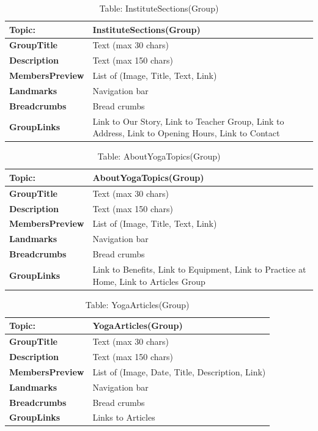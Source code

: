 \begin{table}[H]
\centering
\begin{tabularx}{\textwidth}{|>{\bfseries}l|X|}
\hline
Topic: & \textbf{InstituteSections(Group)} \\
\hline
GroupTitle & Text (max 30 chars) \\
\hline
Description & Text (max 150 chars) \\
\hline
MembersPreview & List of (Image, Title, Text, Link) \\
\hline
Landmarks & Navigation bar \\
\hline
Breadcrumbs & Bread crumbs \\
\hline
GroupLinks & Link to Our Story, Link to Teacher Group, Link to Address, Link to Opening Hours, Link to Contact \\
\hline
\end{tabularx}
\caption{Table: InstituteSections(Group)}
\end{table}

\begin{table}[H]
\centering
\begin{tabularx}{\textwidth}{|>{\bfseries}l|X|}
\hline
Topic: & \textbf{AboutYogaTopics(Group)} \\
\hline
GroupTitle & Text (max 30 chars) \\
\hline
Description & Text (max 150 chars) \\
\hline
MembersPreview & List of (Image, Title, Text, Link) \\
\hline
Landmarks & Navigation bar \\
\hline
Breadcrumbs & Bread crumbs \\
\hline
GroupLinks & Link to Benefits, Link to Equipment, Link to Practice at Home, Link to Articles Group \\
\hline
\end{tabularx}
\caption{Table: AboutYogaTopics(Group)}
\end{table}


\begin{table}[H]
\centering
\begin{tabularx}{\textwidth}{|>{\bfseries}l|X|}
\hline
Topic: & \textbf{YogaArticles(Group)} \\
\hline
GroupTitle & Text (max 30 chars) \\
\hline
Description & Text (max 150 chars) \\
\hline
MembersPreview & List of (Image, Date, Title, Description, Link) \\
\hline
Landmarks & Navigation bar \\
\hline
Breadcrumbs & Bread crumbs \\
\hline
GroupLinks & Links to Articles \\
\hline
\end{tabularx}
\caption{Table: YogaArticles(Group)}
\end{table}
